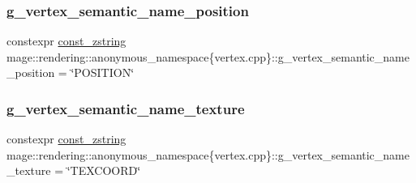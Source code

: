 \subsubsection{\texorpdfstring{g\+\_\+vertex\+\_\+semantic\+\_\+name\+\_\+position}{g\_vertex\_semantic\_name\_position}}
{\footnotesize\ttfamily constexpr \mbox{\hyperlink{namespacemage_abfd9206dc607ceb5d13ec68bf075a5c0}{const\+\_\+zstring}} mage\+::rendering\+::anonymous\+\_\+namespace\{vertex.\+cpp\}\+::g\+\_\+vertex\+\_\+semantic\+\_\+name\+\_\+position = \char`\"{}P\+O\+S\+I\+T\+I\+ON\char`\"{}}

\mbox{\label{namespacemage_1_1rendering_1_1anonymous__namespace_02vertex_8cpp_03_a76de570f9dcc80db1e8e2f0a19536085}} 
\subsubsection{\texorpdfstring{g\+\_\+vertex\+\_\+semantic\+\_\+name\+\_\+texture}{g\_vertex\_semantic\_name\_texture}}
{\footnotesize\ttfamily constexpr \mbox{\hyperlink{namespacemage_abfd9206dc607ceb5d13ec68bf075a5c0}{const\+\_\+zstring}} mage\+::rendering\+::anonymous\+\_\+namespace\{vertex.\+cpp\}\+::g\+\_\+vertex\+\_\+semantic\+\_\+name\+\_\+texture = \char`\"{}T\+E\+X\+C\+O\+O\+RD\char`\"{}}

